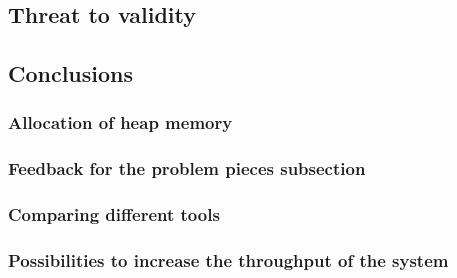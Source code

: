 \subsection{Threat to validity}

\subsection{Conclusions}

\subsubsection{Allocation of heap memory}

\subsubsection{Feedback for the problem pieces subsection}

\subsubsection{Comparing different tools}

\subsubsection{Possibilities to increase the throughput of the system}
